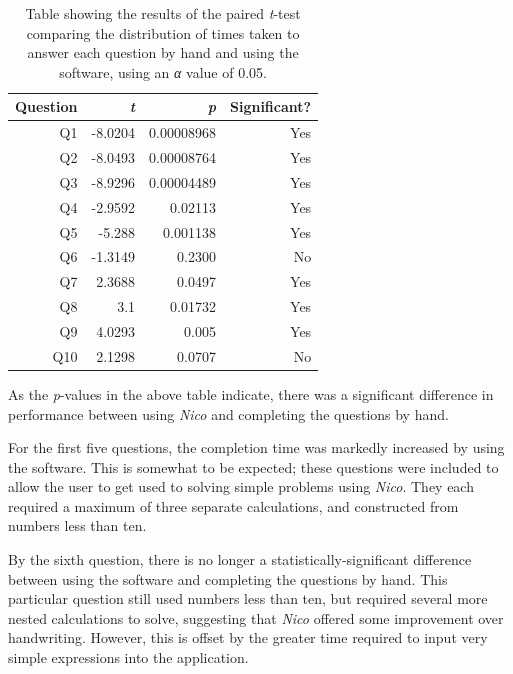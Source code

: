 \documentclass[12pt,twoside,notitlepage,xetex]{report}
\begin{document}
{%
\begin{center}
\begin{table}[H]
\begin{center}
\begin{tabular}{|r|r|r|r|}
\hline
Question & \emph{t} & \emph{p} & Significant?\\ \hline \hline
Q1 & -8.0204 & 0.00008968 & Yes\\ \hline
Q2 & -8.0493 & 0.00008764 & Yes\\ \hline
Q3 & -8.9296 & 0.00004489 & Yes\\ \hline
Q4 & -2.9592 & 0.02113 & Yes\\ \hline
Q5 & -5.288 & 0.001138 & Yes\\ \hline
Q6 & -1.3149 & 0.2300 & No\\ \hline
Q7 & 2.3688 & 0.0497 & Yes\\ \hline
Q8 & 3.1 & 0.01732 & Yes\\ \hline
Q9 & 4.0293 & 0.005 & Yes\\ \hline
Q10 & 2.1298 & 0.0707 & No\\
\hline
\end{tabular}
\end{center}
\caption{Table showing the results of the paired \emph{t}-test comparing the distribution of times taken to answer each question by hand and using the software, using an \emph{α} value of 0.05.}
\label{tab:TTests}
\end{table}
\end{center}

As the \emph{p}-values in the above table indicate, there was a significant difference in performance between using \emph{Nico} and completing the questions by hand.

For the first five questions, the completion time was markedly increased by using the software.  This is somewhat to be expected;  these questions were included to allow the user to get used to solving simple problems using \emph{Nico}.  They each required a maximum of three separate calculations, and constructed from numbers less than ten.

By the sixth question, there is no longer a statistically-significant difference between using the software and completing the questions by hand.  This particular question still used numbers less than ten, but required several more nested calculations to solve, suggesting that \emph{Nico} offered some improvement over handwriting.  However, this is offset by the greater time required to input very simple expressions into the application.

}
\end{document}
